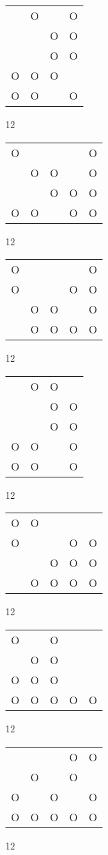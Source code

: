 \begin{tabular}{|m{0.2cm}m{0.2cm}m{0.2cm}m{0.2cm}|}\hline
 &O& &O\\
 & &O&O\\
 & &O&O\\
O&O&O& \\
O&O& &O\\
\hline\end{tabular}12
\begin{tabular}{|m{0.2cm}m{0.2cm}m{0.2cm}m{0.2cm}m{0.2cm}|}\hline
O& & & &O\\
 &O&O& &O\\
 & &O&O&O\\
O&O& &O&O\\
\hline\end{tabular}12
\begin{tabular}{|m{0.2cm}m{0.2cm}m{0.2cm}m{0.2cm}m{0.2cm}|}\hline
O& & & &O\\
O& & &O&O\\
 &O&O& &O\\
 &O&O&O&O\\
\hline\end{tabular}12
\begin{tabular}{|m{0.2cm}m{0.2cm}m{0.2cm}m{0.2cm}|}\hline
 &O&O& \\
 & &O&O\\
 & &O&O\\
O&O& &O\\
O&O& &O\\
\hline\end{tabular}12
\begin{tabular}{|m{0.2cm}m{0.2cm}m{0.2cm}m{0.2cm}m{0.2cm}|}\hline
O&O& & & \\
O& & &O&O\\
 & &O&O&O\\
 &O&O&O&O\\
\hline\end{tabular}12
\begin{tabular}{|m{0.2cm}m{0.2cm}m{0.2cm}m{0.2cm}m{0.2cm}|}\hline
O& &O& & \\
 &O&O& & \\
O&O&O& & \\
O&O&O&O&O\\
\hline\end{tabular}12
\begin{tabular}{|m{0.2cm}m{0.2cm}m{0.2cm}m{0.2cm}m{0.2cm}|}\hline
 & & &O&O\\
 &O& &O& \\
O& &O& &O\\
O&O&O&O&O\\
\hline\end{tabular}12
